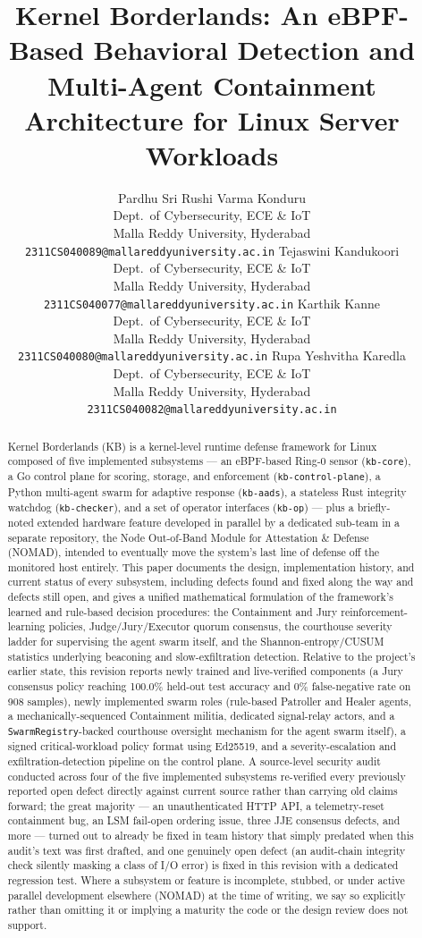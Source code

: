 \documentclass{article}
\title{Kernel Borderlands: An eBPF-Based Behavioral Detection and
Multi-Agent Containment Architecture for Linux Server Workloads}
\author{
  Pardhu Sri Rushi Varma Konduru \\
  Dept.\ of Cybersecurity, ECE \& IoT \\
  Malla Reddy University, Hyderabad \\
  \texttt{2311CS040089@mallareddyuniversity.ac.in}
  \And
  Tejaswini Kandukoori \\
  Dept.\ of Cybersecurity, ECE \& IoT \\
  Malla Reddy University, Hyderabad \\
  \texttt{2311CS040077@mallareddyuniversity.ac.in}
  \And
  Karthik Kanne \\
  Dept.\ of Cybersecurity, ECE \& IoT \\
  Malla Reddy University, Hyderabad \\
  \texttt{2311CS040080@mallareddyuniversity.ac.in}
  \And
  Rupa Yeshvitha Karedla \\
  Dept.\ of Cybersecurity, ECE \& IoT \\
  Malla Reddy University, Hyderabad \\
  \texttt{2311CS040082@mallareddyuniversity.ac.in}
}
\date{}
\begin{document}
\maketitle

\begin{abstract}
Kernel Borderlands (KB) is a kernel-level runtime defense framework for
Linux composed of five implemented subsystems --- an eBPF-based Ring-0
sensor (\texttt{kb-core}), a Go control plane for scoring, storage, and
enforcement (\texttt{kb-control-plane}), a Python multi-agent swarm for
adaptive response (\texttt{kb-aads}), a stateless Rust integrity
watchdog (\texttt{kb-checker}), and a set of operator interfaces
(\texttt{kb-op}) --- plus a briefly-noted extended hardware feature
developed in parallel by a dedicated sub-team in a separate repository,
the Node Out-of-Band Module for Attestation \& Defense (NOMAD),
intended to eventually move the system's last line of defense off the
monitored host entirely. This paper documents the design,
implementation history, and current status of every subsystem,
including defects found and fixed along the way and defects still
open, and gives a unified mathematical formulation of the framework's
learned and rule-based decision procedures: the Containment and Jury
reinforcement-learning policies, Judge/Jury/Executor quorum consensus,
the courthouse severity ladder for supervising the agent swarm itself,
and the Shannon-entropy/CUSUM statistics underlying beaconing and
slow-exfiltration detection. Relative to the project's earlier state,
this revision reports newly trained and live-verified components (a
Jury consensus policy reaching 100.0\% held-out test accuracy and 0\%
false-negative rate on 908 samples), newly implemented swarm roles
(rule-based Patroller and Healer agents, a mechanically-sequenced
Containment militia, dedicated signal-relay actors, and a
\texttt{SwarmRegistry}-backed courthouse oversight mechanism for the
agent swarm itself), a signed critical-workload policy format using
Ed25519, and a severity-escalation and exfiltration-detection pipeline
on the control plane. A source-level security audit conducted across
four of the five implemented subsystems re-verified every previously
reported open defect directly against current source rather than
carrying old claims forward; the great majority --- an unauthenticated
HTTP API, a telemetry-reset containment bug, an LSM fail-open ordering
issue, three JJE consensus defects, and more --- turned out to already
be fixed in team history that simply predated when this audit's text
was first drafted, and one genuinely open defect (an audit-chain
integrity check silently masking a class of I/O error) is fixed in this
revision with a dedicated regression test. Where a subsystem or feature
is incomplete, stubbed, or under active parallel development elsewhere
(NOMAD) at the time of writing, we say so explicitly rather
than omitting it or implying a maturity the code or the design review
does not support.
\end{abstract}
\end{document}
